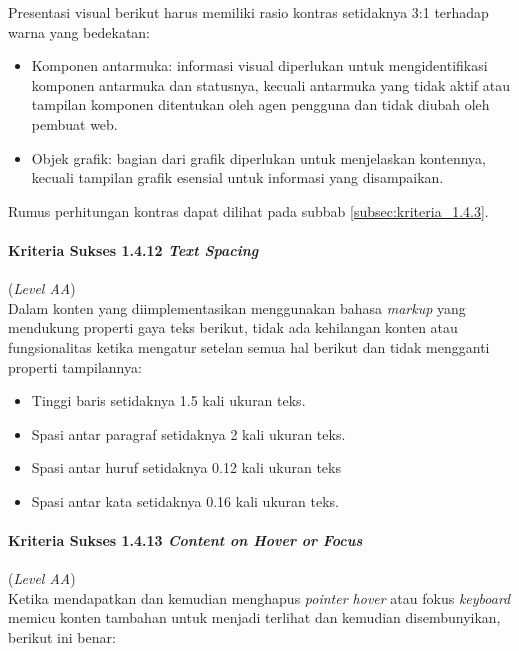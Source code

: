 Presentasi visual berikut harus memiliki rasio kontras setidaknya 3:1 terhadap warna yang bedekatan:

\begin{itemize}
	\item Komponen antarmuka: informasi visual diperlukan untuk mengidentifikasi komponen antarmuka dan statusnya, kecuali antarmuka yang tidak aktif atau tampilan komponen ditentukan oleh agen pengguna dan tidak diubah oleh pembuat web.
	\item Objek grafik: bagian dari grafik diperlukan untuk menjelaskan kontennya, kecuali tampilan grafik esensial untuk informasi yang disampaikan.
\end{itemize}

Rumus perhitungan kontras dapat dilihat pada subbab \ref{subsec:kriteria_1.4.3}.

\paragraph{Kriteria Sukses 1.4.12 \textit{Text Spacing}}
\label{subsec:kriteria_1.4.12}
(\textit{Level AA}) \\

Dalam konten yang diimplementasikan menggunakan bahasa \textit{markup} yang mendukung properti gaya teks berikut, tidak ada kehilangan konten atau fungsionalitas ketika mengatur setelan semua hal berikut dan tidak mengganti properti tampilannya: 

\begin{itemize}
	\item Tinggi baris setidaknya 1.5 kali ukuran teks.
	\item Spasi antar paragraf setidaknya 2 kali ukuran teks.
	\item Spasi antar huruf setidaknya 0.12 kali ukuran teks
	\item Spasi antar kata setidaknya 0.16 kali ukuran teks.
\end{itemize}

\paragraph{Kriteria Sukses 1.4.13 \textit{Content on Hover or Focus}}
\label{subsec:kriteria_1.4.13}
(\textit{Level AA}) \\

Ketika mendapatkan dan kemudian menghapus \textit{pointer hover} atau fokus \textit{keyboard} memicu konten tambahan untuk menjadi terlihat dan kemudian disembunyikan, berikut ini benar:

